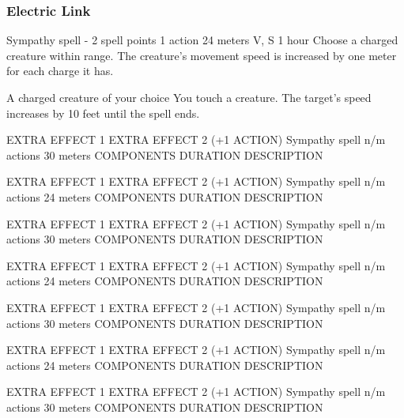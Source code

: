 \subsubsection{Electric Link}
        {Sympathy spell - 2 spell points}
        {1 action}
        {24 meters}
        {V, S}
        {1 hour}
        Choose a charged creature within range.
        The creature's movement speed is increased by one meter for each charge it has.

        A charged creature of your choice
        You touch a creature. The target's speed increases by 10 feet until the spell ends.

        EXTRA EFFECT 1
        EXTRA EFFECT 2 (+1 ACTION)
        {Sympathy spell}
        {n/m actions}
        {30 meters}
        {COMPONENTS}
        {DURATION}
        DESCRIPTION

        EXTRA EFFECT 1
        EXTRA EFFECT 2 (+1 ACTION)
        {Sympathy spell}
        {n/m actions}
        {24 meters}
        {COMPONENTS}
        {DURATION}
        DESCRIPTION

        EXTRA EFFECT 1
        EXTRA EFFECT 2 (+1 ACTION)
        {Sympathy spell}
        {n/m actions}
        {30 meters}
        {COMPONENTS}
        {DURATION}
        DESCRIPTION

        EXTRA EFFECT 1
        EXTRA EFFECT 2 (+1 ACTION)
        {Sympathy spell}
        {n/m actions}
        {24 meters}
        {COMPONENTS}
        {DURATION}
        DESCRIPTION

        EXTRA EFFECT 1
        EXTRA EFFECT 2 (+1 ACTION)
        {Sympathy spell}
        {n/m actions}
        {30 meters}
        {COMPONENTS}
        {DURATION}
        DESCRIPTION

        EXTRA EFFECT 1
        EXTRA EFFECT 2 (+1 ACTION)
        {Sympathy spell}
        {n/m actions}
        {24 meters}
        {COMPONENTS}
        {DURATION}
        DESCRIPTION

        EXTRA EFFECT 1
        EXTRA EFFECT 2 (+1 ACTION)
        {Sympathy spell}
        {n/m actions}
        {30 meters}
        {COMPONENTS}
        {DURATION}
        DESCRIPTION

